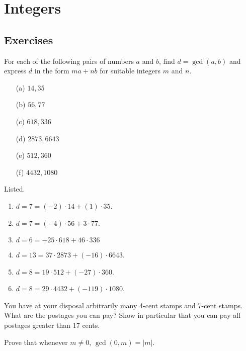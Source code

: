 \section{Integers} 

\subsection{Exercises} 

  \begin{exercise}[Shifrin 1.2.1]
    For each of the following pairs of numbers $a$ and $b$, find $d = \gcd(a,b)$ and express $d$ in the form $ma+nb$ for suitable integers $m$ and $n$.
    \begin{enumerate}
      \item[(a)] $14, 35$
      \item[(b)] $56, 77$
      \item[(c)] $618, 336$
      \item[(d)] $2873, 6643$
      \item[(e)] $512, 360$
      \item[(f)] $4432, 1080$
    \end{enumerate}
  \end{exercise}
  \begin{solution}
    Listed. 
    \begin{enumerate}
      \item $d = 7 = (-2) \cdot 14 + (1) \cdot 35$. 
      \item $d = 7 = (-4) \cdot 56 + 3 \cdot 77$. 
      \item $d = 6 = -25 \cdot 618 + 46 \cdot 336$ 
      \item $d = 13 = 37 \cdot 2873 + (-16) \cdot 6643$. 
      \item $d = 8 = 19 \cdot 512 + (-27) \cdot 360$. 
      \item $d = 8 = 29 \cdot 4432 + (-119) \cdot 1080$. 
    \end{enumerate}
  \end{solution}

  \begin{exercise}[Shifrin 1.2.2]
    You have at your disposal arbitrarily many 4-cent stamps and 7-cent stamps. What are the postages you can pay? Show in particular that you can pay all postages greater than 17 cents.
  \end{exercise}

  \begin{exercise}[Shifrin 1.2.3]
    Prove that whenever $m \neq 0$, $\gcd(0, m) = |m|$.
  \end{exercise}

